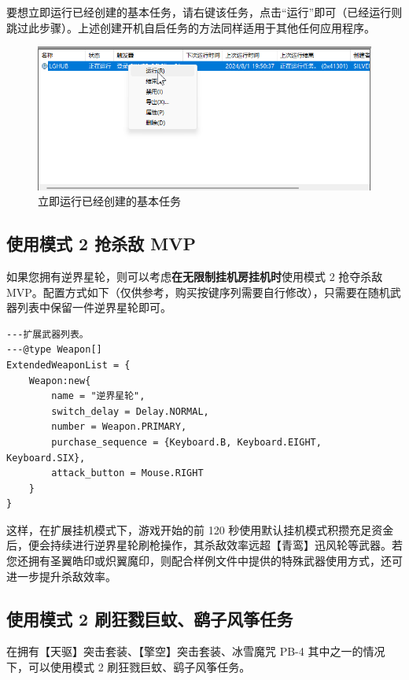 要想立即运行已经创建的基本任务，请右键该任务，点击“运行”即可（已经运行则跳过此步骤）。上述创建开机自启任务的方法同样适用于其他任何应用程序。

\begin{figure}[H]
    \Centering
    \includegraphics[width=\textwidth]{documents/assets/skills/run_task.png}
    \caption{立即运行已经创建的基本任务}
\end{figure}


\subsection{使用模式 2 抢杀敌 MVP}
\label{subsection-mode-2-skill-0}

如果您拥有逆界星轮，则可以考虑\textbf{在无限制挂机房挂机时}使用模式 2 抢夺杀敌 MVP。配置方式如下（仅供参考，购买按键序列需要自行修改），只需要在随机武器列表中保留一件逆界星轮即可。

\begin{verbatim}
---扩展武器列表。
---@type Weapon[]
ExtendedWeaponList = {
    Weapon:new{
        name = "逆界星轮",
        switch_delay = Delay.NORMAL,
        number = Weapon.PRIMARY,
        purchase_sequence = {Keyboard.B, Keyboard.EIGHT, Keyboard.SIX},
        attack_button = Mouse.RIGHT
    }
}
\end{verbatim}

这样，在扩展挂机模式下，游戏开始的前 120 秒使用默认挂机模式积攒充足资金后，便会持续进行逆界星轮刷枪操作，其杀敌效率远超【青鸾】迅风轮等武器。若您还拥有圣翼皓印或炽翼魔印，则配合样例文件中提供的特殊武器使用方式，还可进一步提升杀敌效率。

\subsection{使用模式 2 刷狂戮巨蚊、鹞子风筝任务}
\label{subsection-mode-2-skill-1}

在拥有【天驱】突击套装、【擎空】突击套装、冰雪魔咒 PB-4 其中之一的情况下，可以使用模式 2 刷狂戮巨蚊、鹞子风筝任务。

